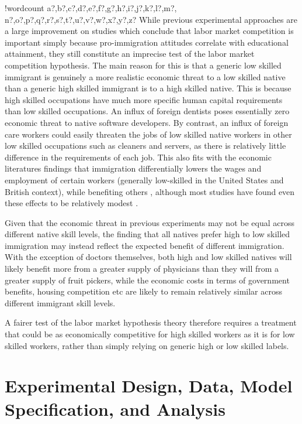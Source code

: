 \documentclass{article}\usepackage[]{graphicx}\usepackage[]{color}
\newcounter{words}
\newenvironment{counted}{%
\setcounter{words}{0}
\SearchList!{wordcount}{\stepcounter{words}}
{a?,b?,c?,d?,e?,f?,g?,h?,i?,j?,k?,l?,m?,
n?,o?,p?,q?,r?,s?,t?,u?,v?,w?,x?,y?,z?}
\UndoBoundary{'}
\SearchOrder{p;}}{%
\StopSearching}
\begin{document}
\begin{counted}
While previous experimental approaches are a large improvement on studies which conclude that labor market competition is important simply because pro-immigration attitudes correlate with educational attainment, they still constitute an imprecise test of the labor market competition hypothesis. The main reason for this is that a generic low skilled immigrant is genuinely a more realistic economic threat to a low skilled native than a generic high skilled immigrant is to a high skilled native. This is because high skilled occupations have much more specific human capital requirements than low skilled occupations. An influx of foreign dentists poses essentially zero economic threat to native software developers. By contrast, an influx of foreign care workers could easily threaten the jobs of low skilled native workers in other low skilled occupations such as cleaners and servers, as there is relatively little difference in the requirements of each job. This also fits with the economic literatures findings that immigration differentially lowers the wages and employment of certain workers (generally low-skilled in the United States and British context), while benefiting others \autocite{Borjas2003,Peri2009,Orrenius2007}, although most studies have found even these effects to be relatively modest \autocite{Peri2009,Ottaviano2012,Gaston2013}.

Given that the economic threat in previous experiments may not be equal across different native skill levels, the finding that all natives prefer high to low skilled immigration may instead reflect the expected benefit of different immigration. With the exception of doctors themselves, both high and low skilled natives will likely benefit more from a greater supply of physicians than they will from a greater supply of fruit pickers, while the economic costs in terms of government benefits, housing competition etc are likely to remain relatively similar across different immigrant skill levels. 

A fairer test of the labor market hypothesis theory therefore requires a treatment that could be as economically competitive for high skilled workers as it is for low skilled workers, rather than simply relying on generic high or low skilled labels.







\section{Experimental Design, Data, Model Specification, and Analysis}


\end{counted}
\end{document}
